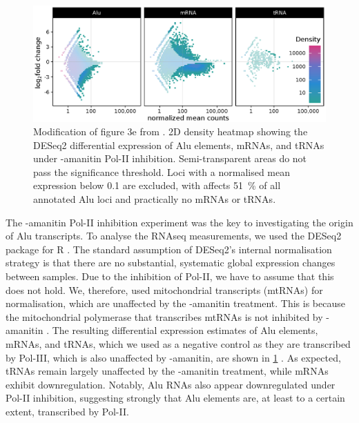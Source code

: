 \begin{figure}[b!]
\centering
\includegraphics[width=\textwidth]{04_GraphicFiles/02_alu_deseq2.eps}
\caption{Modification of figure 3e from \citet{Baar2022}. 2D density heatmap
  showing the DESeq2 differential expression of Alu elements, mRNAs, and tRNAs
  under \textalpha-amanitin Pol-II inhibition. Semi-transparent areas do not
  pass the significance threshold. Loci with a normalised mean expression
  below 0.1 are excluded, with affects \SI{51}{\percent} of all annotated
  Alu loci and practically no mRNAs or tRNAs.}
\label{fig:aludeseq2}
\end{figure}

\noindent The \textalpha-amanitin
\label{mar:aludeseq2} Pol-II inhibition experiment was the key to
investigating the origin of Alu transcripts. To analyse the RNAseq
measurements, we used the DESeq2 package for R \citep{Love2014}. The standard
assumption of DESeq2's internal normalisation strategy is that there are no
substantial, systematic global expression changes between samples. Due to the
inhibition of Pol-II, we have to assume that this does not hold. We,
therefore, used mitochondrial transcripts (mtRNAs) for normalisation, which
are unaffected by the \textalpha-amanitin treatment. This is because the
mitochondrial polymerase that transcribes mtRNAs is not inhibited by
\textalpha-amanitin \citep{Menon1971,Reid2830,Saccone1971}. The resulting
differential expression estimates of Alu elements, mRNAs, and tRNAs, which we
used as a negative control as they are transcribed by Pol-III, which is also
unaffected by \textalpha-amanitin, are shown in \cref{fig:aludeseq2}
\citep{ White1997}. As expected, tRNAs remain largely unaffected by the
\textalpha-amanitin treatment, while mRNAs exhibit downregulation. Notably,
Alu RNAs also appear downregulated under Pol-II inhibition, suggesting
strongly that Alu elements are, at least to a certain extent, transcribed by
Pol-II.
\bigbreak

